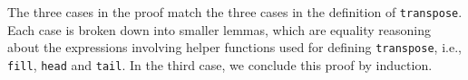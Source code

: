 \documentclass{l4proj}
\begin{document}
\begin{code}
\>[2][@{}l@{\AgdaIndent{0}}]%
\>[4]\AgdaSymbol{(}\AgdaSpace{}%
\AgdaSymbol{(}\AgdaSpace{}%
\AgdaSymbol{)}\AgdaSpace{}%
\AgdaSymbol{(}\AgdaSpace{}%
\AgdaSpace{}%
\AgdaSymbol{))}\AgdaSpace{}%
\<%
\\
%
\>[4]\AgdaSymbol{(}\AgdaSpace{}%
\AgdaSpace{}%
\AgdaSymbol{)}\AgdaSpace{}%
\AgdaSpace{}%
\AgdaSpace{}%
\AgdaSymbol{(}\AgdaSpace{}%
\AgdaSpace{}%
\AgdaSpace{}%
\AgdaSpace{}%
\AgdaSpace{}%
\AgdaSpace{}%
\AgdaSymbol{(}\AgdaSpace{}%
\AgdaSymbol{(}\AgdaSpace{}%
\AgdaSpace{}%
\AgdaSpace{}%
\AgdaSpace{}%
\AgdaSymbol{)))}\<%
\\
%
\>[2]\AgdaSpace{}%
\AgdaSpace{}%
\AgdaSpace{}%
\AgdaSpace{}%
\AgdaSpace{}%
\AgdaSymbol{(}\AgdaSpace{}%
\AgdaSpace{}%
\AgdaSymbol{)}\AgdaSpace{}%
\AgdaSpace{}%
\AgdaSpace{}%
\AgdaSymbol{)}\AgdaSpace{}%
\AgdaSymbol{(}\AgdaSpace{}%
\AgdaSpace{}%
\AgdaSymbol{)}\AgdaSpace{}%
\<%
\\
\>[2][@{}l@{\AgdaIndent{0}}]%
\>[4]\AgdaSymbol{(}\AgdaSpace{}%
\AgdaSpace{}%
\AgdaSymbol{)}\AgdaSpace{}%
\AgdaSpace{}%
\AgdaSpace{}%
\AgdaSymbol{(}\AgdaSpace{}%
\AgdaSymbol{)}\<%
\\
%
\>[2]\AgdaSpace{}%
\AgdaSpace{}%
\AgdaSymbol{((}\AgdaSpace{}%
\AgdaSpace{}%
\AgdaSymbol{)}\AgdaSpace{}%
\AgdaSymbol{)}\AgdaSpace{}%
\AgdaSymbol{(}\AgdaSpace{}%
\AgdaSymbol{)}\AgdaSpace{}%
\<%
\\
\>[2][@{}l@{\AgdaIndent{0}}]%
\>[4]\<%
\end{code}
The three cases in the proof match the three cases in the definition of \texttt{transpose}. Each case is broken down into smaller lemmas, which are equality reasoning about the expressions involving helper functions used for defining \texttt{transpose}, i.e.,  \texttt{fill}, \texttt{head} and \texttt{tail}. In the third case, we conclude this proof by induction.
\end{document}
